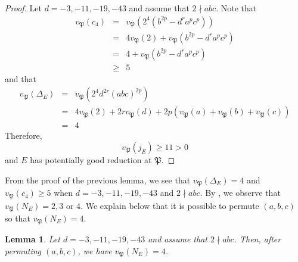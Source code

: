 \documentclass[]{article}
\newtheorem{lemma}{Lemma}
\newcommand {\mfp}{{\mathfrak{P}}}
\begin{document}
\begin{proof}
   Let $d=-3,-11,-19,-43$ and assume that $2\nmid abc$. Note that 
  \begin{eqnarray*}
    v_{\mfp}(c_4)&=&v_{\mfp}(2^4(b^{2p}-d^ra^pc^p))\\
    &=&4v_{\mfp}(2)+v_{\mfp}(b^{2p}-d^ra^pc^p)\\
    &=&4+v_\mfp(b^{2p}-d^ra^pc^p)\\
    &\ge& 5
\end{eqnarray*}and that
    \begin{eqnarray*}
    v_{\mfp}(\Delta_E)&=& v_{\mfp}(2^4d^{2r}(abc)^{2p})\\
    &=&4v_{\mfp}(2)+2rv_{\mfp}(d)+2p(v_{\mfp}(a)+v_{\mfp}(b)+v_{\mfp}(c))\\
    &=&4
    \end{eqnarray*}Therefore,$$v_{\mfp}(j_E)\ge 11>0$$and $E$ has potentially good reduction at $\mfp$.
\end{proof}

From the proof of the previous lemma, we see that $v_{\mfp}(\Delta_E)=4$ and $v_{\mfp}(c_4)\ge 5$ when $d=-3,-11,-19,-43$ and $2\nmid abc$. By \cite[Tableau IV]{papadopoulos1993neron}, we observe that $v_\mfp(N_E)=2,3$ or $4$. We explain below that it is possible to permute $(a,b,c)$ so that $v_\mfp(N_E)=4$.

\begin{lemma}
    Let $d=-3,-11,-19,-43$ and assume that $2\nmid abc$. Then, after permuting $(a,b,c)$, we have $v_\mfp(N_E)=4$.
\end{lemma}
\end{document}
